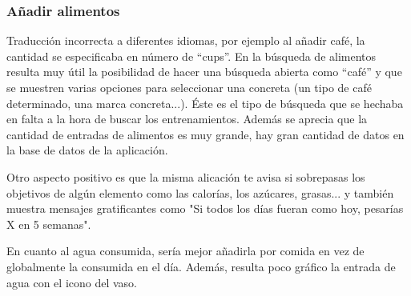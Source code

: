 \documentclass[a4paper]{article}
\begin{document}
			\subsubsection*{Añadir alimentos}
			
			Traducción incorrecta a diferentes idiomas, por ejemplo al añadir café, la cantidad se especificaba en número de ``cups''. En la búsqueda de alimentos resulta muy útil la posibilidad de hacer una búsqueda abierta como ``café'' y que se muestren varias opciones para seleccionar una concreta (un tipo de café determinado, una marca concreta...). Éste es el tipo de búsqueda que se hechaba en falta a la hora de buscar los entrenamientos. Además se aprecia que la cantidad de entradas de alimentos es muy grande, hay gran cantidad de datos en la base de datos de la aplicación.
			
			Otro aspecto positivo es que la misma alicación te avisa si sobrepasas los objetivos de algún elemento como las calorías, los azúcares, grasas... y también muestra mensajes gratificantes como "Si todos los días fueran como hoy, pesarías X en 5 semanas".
			
			En cuanto al agua consumida, sería mejor añadirla por comida en vez de globalmente la consumida en el día. Además, resulta poco gráfico la entrada de agua con el icono del vaso.
			
\end{document}
